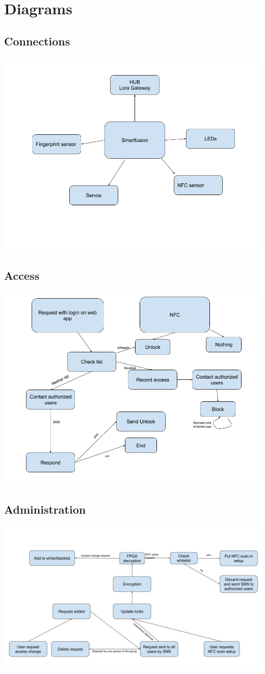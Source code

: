 \documentclass{article}
\begin{document}
\section{Diagrams}

\subsection*{Connections}
\includegraphics[scale=0.35]{Connections.png}

\subsection*{Access}
\includegraphics[scale=0.35]{Access.png}

\subsection*{Administration}
\includegraphics[scale=0.35]{Administration.png}
\end{document}

